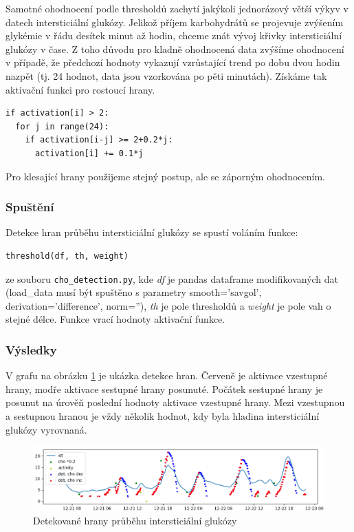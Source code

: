 Samotné ohodnocení podle thresholdů zachytí jakýkoli jednorázový větší výkyv v datech intersticiální glukózy. Jelikož příjem karbohydrátů se projevuje zvýšením glykémie v řádu desítek minut až hodin, chceme znát vývoj křivky intersticiální glukózy v čase. Z toho důvodu pro kladně ohodnocená data zvýšíme ohodnocení v případě, že předchozí hodnoty vykazují vzrůstající trend po dobu dvou hodin nazpět (tj. 24 hodnot, data jsou vzorkována po pěti minutách). Získáme tak aktivační funkci pro rostoucí hrany.
\begin{verbatim}
if activation[i] > 2:
  for j in range(24):
    if activation[i-j] >= 2+0.2*j:
      activation[i] += 0.1*j
\end{verbatim}
Pro klesající hrany použijeme stejný postup, ale se záporným ohodnocením.

\subsubsection{Spuštění}

Detekce hran průběhu intersticiální glukózy se spustí voláním funkce:
\begin{verbatim}
threshold(df, th, weight)
\end{verbatim}
ze souboru \texttt{cho\_detection.py}, kde \textit{df} je pandas dataframe modifikovaných dat (load\_data musí být spuštěno s parametry smooth='savgol', derivation='difference', norm=''), \textit{th} je pole thresholdů a \textit{weight} je pole vah o stejné délce. Funkce vrací hodnoty aktivační funkce.

\subsubsection{Výsledky}
V grafu na obrázku \ref{fig:hrany} je ukázka detekce hran. Červeně je aktivace vzestupné hrany, modře aktivace sestupné hrany posunuté. Počátek sestupné hrany je posunut na úrověň poslední hodnoty aktivace vzestupné hrany. Mezi vzestupnou a sestupnou hranou je vždy několik hodnot, kdy byla hladina intersticiální glukózy vyrovnaná.

\begin{figure}[H]
\caption{Detekované hrany průběhu intersticiální glukózy}
\label{fig:hrany}
\centering
\includegraphics[width=1\textwidth]{img/cho/hrany.png}
\end{figure}

